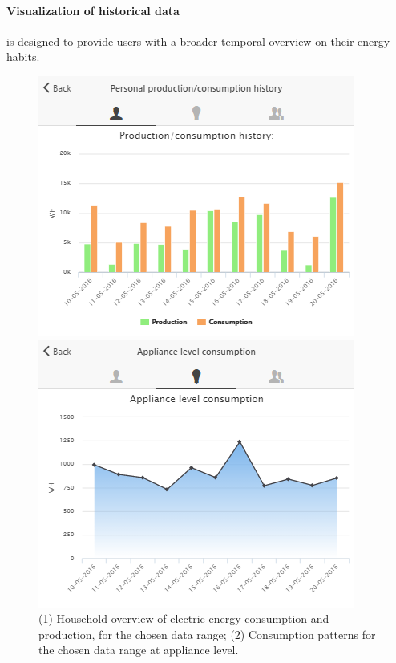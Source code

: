 \paragraph{Visualization of historical data} is designed to provide users with a broader temporal overview on their energy habits.
\begin{figure}[htb]
      \begin{center}
        \begin{minipage}[htb]{0.33\linewidth}    
         \includegraphics[width=1\linewidth]{img/historicalcomparison_prodcons.png}
        \end{minipage}
        \begin{minipage}[htb]{0.33\linewidth}    
         \includegraphics[width=1\linewidth]{img/applianceconsumption.png}
        \end{minipage}
      \end{center}
      \caption{(1) Household overview of electric energy consumption and production, for the chosen data range; (2) Consumption patterns for the chosen data range at appliance level.
}
\label{fig:viz_hist}
\end{figure}


